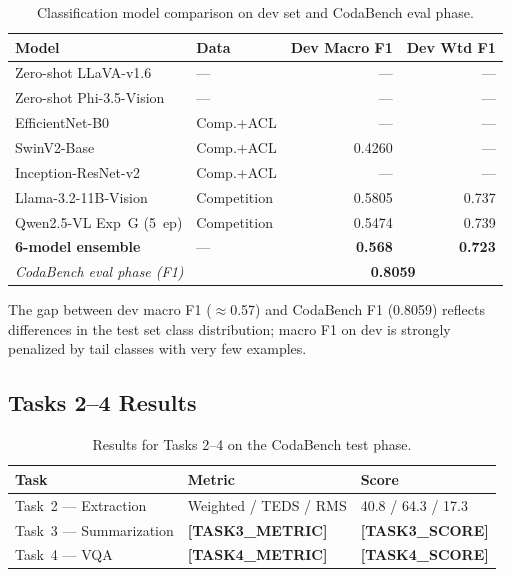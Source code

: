 \documentclass[11pt]{tibop-article}
\newcommand{\FILL}[1]{\textbf{[#1]}}
\begin{document}
\begin{table}[h!]
  \caption{Classification model comparison on dev set and CodaBench eval phase.}\label{tab:classification}
  \begin{tabularx}{\linewidth}{lXrr}
    \toprule
    \textbf{Model} & \textbf{Data} & \textbf{Dev Macro F1} & \textbf{Dev Wtd F1} \\
    \midrule
    Zero-shot LLaVA-v1.6       & —           & —      & —      \\
    Zero-shot Phi-3.5-Vision    & —           & —      & —      \\
    EfficientNet-B0             & Comp.+ACL   & —      & —      \\
    SwinV2-Base                 & Comp.+ACL   & 0.4260 & —      \\
    Inception-ResNet-v2         & Comp.+ACL   & —      & —      \\
    Llama-3.2-11B-Vision        & Competition & 0.5805 & 0.737  \\
    Qwen2.5-VL Exp~G (5~ep)     & Competition & 0.5474 & 0.739  \\
    \midrule
    \textbf{6-model ensemble}   & —           & \textbf{0.568}  & \textbf{0.723}  \\
    \midrule
    \multicolumn{2}{l}{\textit{CodaBench eval phase (F1)}} & \multicolumn{2}{c}{\textbf{0.8059}} \\
    \bottomrule
  \end{tabularx}
\end{table}

The gap between dev macro F1 ($\approx$0.57) and CodaBench F1 (0.8059) reflects
differences in the test set class distribution; macro F1 on dev is strongly
penalized by tail classes with very few examples.

\subsection{Tasks 2--4 Results}

\begin{table}[h!]
  \caption{Results for Tasks 2--4 on the CodaBench test phase.}\label{tab:tasks234}
  \begin{tabularx}{\linewidth}{llX}
    \toprule
    \textbf{Task} & \textbf{Metric} & \textbf{Score} \\
    \midrule
    Task~2 — Extraction    & Weighted / TEDS / RMS         & 40.8 / 64.3 / 17.3 \\
    Task~3 — Summarization & \FILL{TASK3\_METRIC}           & \FILL{TASK3\_SCORE} \\
    Task~4 — VQA           & \FILL{TASK4\_METRIC}           & \FILL{TASK4\_SCORE} \\
    \bottomrule
  \end{tabularx}
\end{table}
\end{document}
